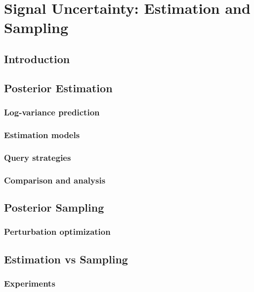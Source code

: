 \chapter{Signal Uncertainty: Estimation and Sampling} %

\label{chap:variance} %



\section{Introduction}

\label{sec:var_intro}


\section{Posterior Estimation}

\subsection{Log-variance prediction}

\subsection{Estimation models}

\subsection{Query strategies}

\subsection{Comparison and analysis}


\section{Posterior Sampling}

\label{sec:sampling}

\subsection{Perturbation optimization}



\section{Estimation vs Sampling}

\subsection{Experiments}
